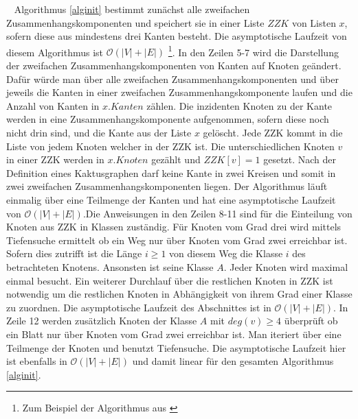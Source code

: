 \vspace{-6mm}
~\linebreak
Algorithmus \ref{alginit} bestimmt zunächst alle zweifachen Zusammenhangskomponenten und speichert sie in einer Liste $ZZK$ von Listen $x$, sofern diese aus mindestens drei Kanten besteht. Die asymptotische Laufzeit von diesem Algorithmus ist $\mathcal{O}(|V|+|E|)$ \footnote{Zum Beispiel der Algorithmus aus \cite{Vorlesung}}. \newline
In den Zeilen 5-7 wird die Darstellung der zweifachen Zusammenhangskomponenten von Kanten auf Knoten geändert. Dafür würde man über alle zweifachen Zusammenhangskomponenten und über jeweils die Kanten in einer zweifachen Zusammenhangskomponente laufen und die Anzahl von Kanten in $x.Kanten$ zählen. Die inzidenten Knoten zu der Kante werden in eine Zusammenhangskomponente aufgenommen, sofern diese noch nicht drin sind, und die Kante aus der Liste $x$ gelöscht. Jede ZZK kommt in die Liste von jedem Knoten welcher in der ZZK ist. Die unterschiedlichen Knoten $v$ in einer ZZK werden in $x.Knoten$ gezählt und $ZZK[v]=1$ gesetzt. Nach der Definition eines Kaktusgraphen darf keine Kante in zwei Kreisen und somit in zwei zweifachen Zusammenhangskomponenten liegen. Der Algorithmus läuft einmalig über eine Teilmenge der Kanten und hat eine asymptotische Laufzeit von $\mathcal{O}(|V|+|E|)$.\newline\newline Die Anweisungen in den Zeilen 8-11 sind für die Einteilung von Knoten aus ZZK in Klassen zuständig. Für Knoten vom Grad drei wird mittels Tiefensuche ermittelt ob ein Weg nur über Knoten vom Grad zwei erreichbar ist. Sofern dies zutrifft ist die Länge $i\geq 1$ von diesem Weg die Klasse $i$ des betrachteten Knotens. Ansonsten ist seine Klasse $A$. Jeder Knoten wird maximal einmal besucht. Ein weiterer Durchlauf über die restlichen Knoten in ZZK ist notwendig um die restlichen Knoten in Abhängigkeit von ihrem Grad einer Klasse zu zuordnen. Die asymptotische Laufzeit des Abschnittes ist in $\mathcal{O}(|V|+|E|)$.\newline\newline
In Zeile 12 werden zusätzlich Knoten der Klasse $A$  mit $deg(v)\geq 4$ überprüft ob ein Blatt nur über Knoten vom Grad zwei erreichbar ist. Man iteriert über eine Teilmenge der Knoten und benutzt Tiefensuche. Die asymptotische Laufzeit hier ist ebenfalls in $\mathcal{O}(|V|+|E|)$ und damit linear für den gesamten Algorithmus \ref{alginit}.
